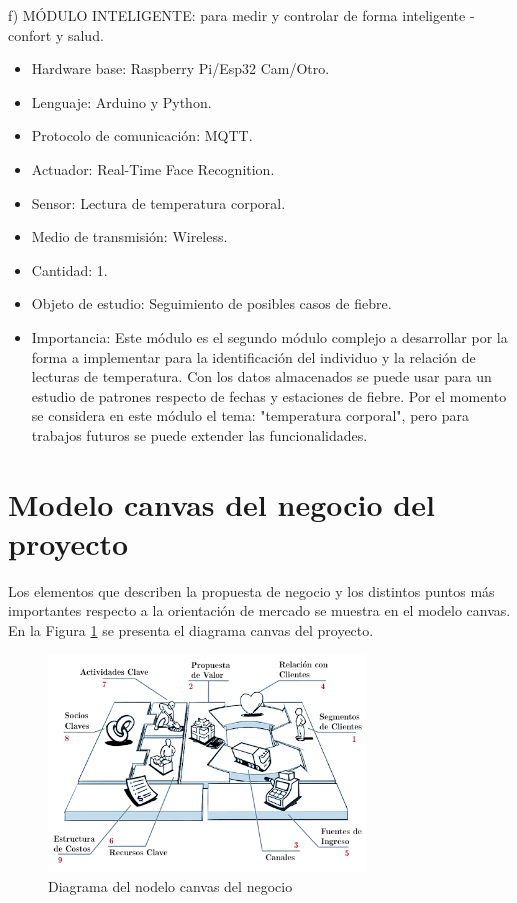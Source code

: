 \documentclass[11pt]{charter}
\begin{document}
f) MÓDULO INTELIGENTE: para medir y controlar de forma inteligente - confort y salud.
\begin{itemize}
\item Hardware base: Raspberry Pi/Esp32 Cam/Otro.
\item Lenguaje: Arduino y Python.
\item Protocolo de comunicación: MQTT.
\item Actuador: Real-Time Face Recognition.
\item Sensor: Lectura de temperatura corporal.
\item Medio de transmisión: Wireless.
\item Cantidad: 1.
\item Objeto de estudio: Seguimiento de posibles casos de fiebre.
\item Importancia: Este módulo es el segundo módulo complejo a desarrollar por la forma a implementar para la identificación del individuo y la relación de lecturas de temperatura. Con los datos almacenados se puede usar para un estudio de patrones respecto de fechas y estaciones de fiebre. Por el momento se considera en este módulo el tema: "temperatura corporal", pero para trabajos futuros se puede extender las funcionalidades.
\end{itemize}

\section{Modelo canvas del negocio del proyecto}

Los elementos que describen la propuesta de negocio y los distintos puntos más importantes respecto a la orientación de mercado se muestra en el modelo canvas. En la Figura \ref{fig:diagCanvas} se presenta el diagrama canvas del proyecto. 

\vspace{15px}

\begin{figure}[htpb]
\centering 
\includegraphics[width=0.75\textwidth]{./Figuras/diagCanvas.png}
\caption{Diagrama del nodelo canvas del negocio}
\label{fig:diagCanvas}
\end{figure}
\end{document}

